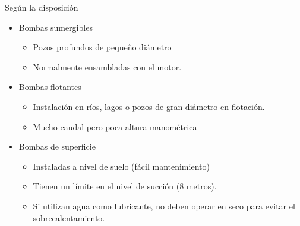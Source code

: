 \documentclass[xcolor={usenames,svgnames,dvipsnames}]{beamer}
\begin{document}
\begin{frame}[label=sec-2-2-9]{Según la disposición}
\begin{itemize}
\item \alert{Bombas sumergibles}

\begin{itemize}
\item Pozos profundos de pequeño diámetro

\item Normalmente ensambladas con el motor.
\end{itemize}

\item \alert{Bombas flotantes}

\begin{itemize}
\item Instalación en ríos, lagos o pozos de gran diámetro en flotación.

\item Mucho caudal pero poca altura manométrica
\end{itemize}

\item \alert{Bombas de superficie}

\begin{itemize}
\item Instaladas a nivel de suelo (fácil mantenimiento)

\item Tienen un límite en el nivel de succión (8 metros).

\item Si utilizan agua como lubricante, no deben operar en seco para evitar el sobrecalentamiento.
\end{itemize}
\end{itemize}
\end{frame}
\end{document}
